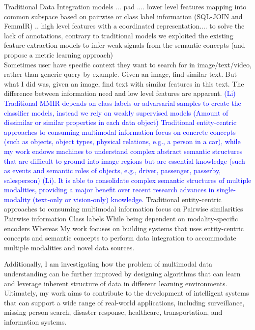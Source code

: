 Traditional Data Integration models ... pad .... lower level features mapping into common subspace based on pairwise or class label information (SQL-JOIN and FemmIR) .. high level features with a coordinated representation.... to solve the lack of annotations, contrary to traditional models we exploited the existing feature extraction models to infer weak signals from the semantic concepts (and propose a metric learning approach)\\
Sometimes user have specific context they want to search for in image/text/video, rather than generic query by example. Given an image, find similar text. But what I did was, given an image, find text with similar features in this text. The difference between information need and low level features are apparent.
%
\textcolor{blue}{
(Li) Traditional MMIR depends on class labels or advarsarial samples to create the classifier models, instead we rely on weakly supervised models (Amount of dissimilar or similar properties in each data object)
Traditional entity-centric approaches to consuming multimodal information focus on concrete concepts (such as objects, object types, physical relations, e.g., a person in a car), while my work endows machines to understand complex abstract semantic structures that are difficult to ground into image regions but are essential knowledge (such as events and semantic roles of objects, e.g., driver, passenger, passerby, salesperson) (Li).
It is able to consolidate complex semantic structures of multiple modalities, providing a major benefit over recent research advances in single-modality (text-only or vision-only) knowledge. 
}
Traditional entity-centric approaches to consuming multimodal information focus on 
Pairwise similarities
Pairwise information
Class labels
While being dependent on modality-specific encoders 
Whereas 
My work focuses on building systems that uses entity-centric concepts and semantic concepts to perform data integration to accommodate multiple modalities and novel data sources.

Additionally, I am investigating how the problem of multimodal data understanding can be further improved by designing algorithms that can learn and leverage inherent structure of data in different learning environments.
Ultimately, my work aims to contribute to the development of intelligent systems that can support a wide range of real-world applications, including surveillance, missing person search, disaster response, healthcare, transportation, and information systems.

